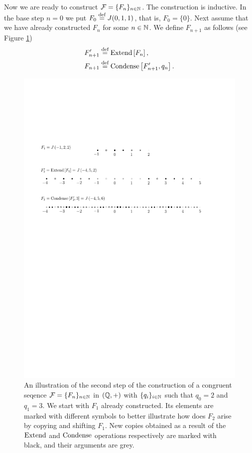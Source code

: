 Now we are ready to construct $\operatorname{\mathcal{F}}=\{F_n\}_{n\in\mathbb{N}}$. The construction is inductive. 
%
In the base step $n=0$ we put $F_0\stackrel{\textup{def}}{=} J(0,1,1)$, that is, $F_0=\{0\}.$ 
%
Next assume that we have already constructed $F_n$ for some $n\in\mathbb{N}$. 
%
We define $F_{n+1}$ as follows (see Figure \ref{fig:folner_in_Q})
\begin{align*}
&F_{n+1}'\stackrel{\textup{def}}{=} \operatorname{Extend} \left[F_n\right], \\
&F_{n+1} \stackrel{\textup{def}}{=} \operatorname{Condense} \left[ F_{n+1}', q_{n}\right].
\end{align*}

\begin{figure}
\centering
\includegraphics[scale=0.9]{Graphics/folnerQ}
\caption{An illustration of the second step of the construction of a congruent \Folner seqence $\operatorname{\mathcal{F}}=\{F_n\}_{n\in\mathbb{N}}$ in $(\mathbb{Q},+)$ with $\{q_i\}_{i\in\mathbb{N}}$ such that $q_0=2$ and $q_1=3$. We start with $F_1$ already constructed. Its elements are marked with different symbols to better illustrate how does $F_2$ arise by copying and shifting $F_1$. New copies obtained as a result of the  $\operatorname{Extend}$ and $\operatorname{Condense}$ operations respectively are marked with black, and their arguments are grey.}\label{fig:folner_in_Q}
\end{figure}

